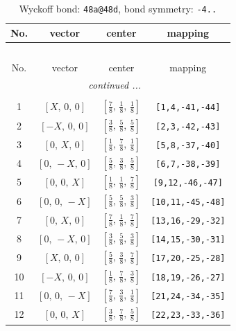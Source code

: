 \documentclass[fleqn,8pt]{jsarticle}
\begin{document}
\begin{longtable}{cccc}
\caption{Wyckoff bond: {\tt 48a@48d}, bond symmetry: {\tt -4..}}
 \\
 \hline \hline
No. & vector & center & mapping \\ \hline \endfirsthead

\multicolumn{3}{l}{\tablename\ \thetable{}} \\
 \hline \hline
No. & vector & center & mapping \\ \hline \endhead

 \hline \hline
\multicolumn{3}{r}{\footnotesize\it continued ...} \\ \endfoot

 \hline \hline
\multicolumn{3}{r}{} \\ \endlastfoot

1 & $\left[ X,\, 0,\, 0 \right]$ & $\left[ \frac{7}{8},\, \frac{1}{8},\, \frac{1}{8} \right]$ & {\tt [1,4,-41,-44]} \\ \hline
2 & $\left[ - X,\, 0,\, 0 \right]$ & $\left[ \frac{3}{8},\, \frac{5}{8},\, \frac{5}{8} \right]$ & {\tt [2,3,-42,-43]} \\ \hline
3 & $\left[ 0,\, X,\, 0 \right]$ & $\left[ \frac{1}{8},\, \frac{7}{8},\, \frac{1}{8} \right]$ & {\tt [5,8,-37,-40]} \\ \hline
4 & $\left[ 0,\, - X,\, 0 \right]$ & $\left[ \frac{5}{8},\, \frac{3}{8},\, \frac{5}{8} \right]$ & {\tt [6,7,-38,-39]} \\ \hline
5 & $\left[ 0,\, 0,\, X \right]$ & $\left[ \frac{1}{8},\, \frac{1}{8},\, \frac{7}{8} \right]$ & {\tt [9,12,-46,-47]} \\ \hline
6 & $\left[ 0,\, 0,\, - X \right]$ & $\left[ \frac{5}{8},\, \frac{5}{8},\, \frac{3}{8} \right]$ & {\tt [10,11,-45,-48]} \\ \hline
7 & $\left[ 0,\, X,\, 0 \right]$ & $\left[ \frac{7}{8},\, \frac{1}{8},\, \frac{7}{8} \right]$ & {\tt [13,16,-29,-32]} \\ \hline
8 & $\left[ 0,\, - X,\, 0 \right]$ & $\left[ \frac{3}{8},\, \frac{5}{8},\, \frac{3}{8} \right]$ & {\tt [14,15,-30,-31]} \\ \hline
9 & $\left[ X,\, 0,\, 0 \right]$ & $\left[ \frac{5}{8},\, \frac{3}{8},\, \frac{7}{8} \right]$ & {\tt [17,20,-25,-28]} \\ \hline
10 & $\left[ - X,\, 0,\, 0 \right]$ & $\left[ \frac{1}{8},\, \frac{7}{8},\, \frac{3}{8} \right]$ & {\tt [18,19,-26,-27]} \\ \hline
11 & $\left[ 0,\, 0,\, - X \right]$ & $\left[ \frac{7}{8},\, \frac{3}{8},\, \frac{1}{8} \right]$ & {\tt [21,24,-34,-35]} \\ \hline
12 & $\left[ 0,\, 0,\, X \right]$ & $\left[ \frac{3}{8},\, \frac{7}{8},\, \frac{5}{8} \right]$ & {\tt [22,23,-33,-36]} \\
\end{longtable}
\end{document}
